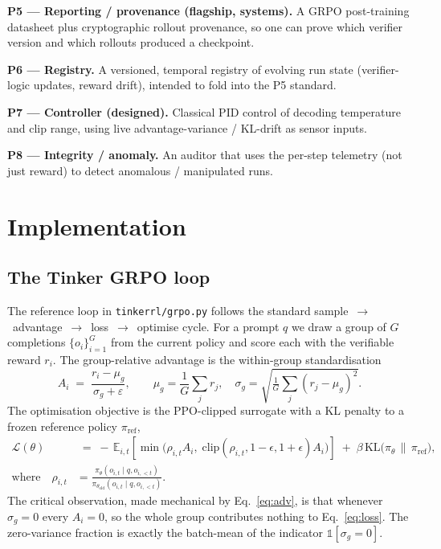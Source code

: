 \documentclass[11pt,a4paper]{article}
\begin{document}
\textbf{P5 --- Reporting / provenance (flagship, systems).} A GRPO post-training
datasheet plus cryptographic rollout provenance, so one can prove which verifier
version and which rollouts produced a checkpoint.


\textbf{P6 --- Registry.} A versioned, temporal registry of evolving run state
(verifier-logic updates, reward drift), intended to fold into the P5 standard.

\textbf{P7 --- Controller (designed).} Classical PID control of decoding temperature
and clip range, using live advantage-variance / KL-drift as sensor inputs.

\textbf{P8 --- Integrity / anomaly.} An auditor that uses the per-step telemetry
(not just reward) to detect anomalous / manipulated runs.

\section{Implementation}
\label{sec:impl}

\subsection{The Tinker GRPO loop}


The reference loop in \texttt{tinkerrl/grpo.py} follows the standard
sample~$\rightarrow$~advantage~$\rightarrow$~loss~$\rightarrow$~optimise cycle.
For a prompt $q$ we draw a group of $G$ completions $\{o_i\}_{i=1}^{G}$ from the
current policy and score each with the verifiable reward $r_i$. The
group-relative advantage is the within-group standardisation
\begin{equation}
A_i \;=\; \frac{r_i - \mu_g}{\sigma_g + \varepsilon},
\qquad
\mu_g = \frac{1}{G}\sum_{j} r_j,\quad
\sigma_g = \sqrt{\tfrac{1}{G}\sum_j (r_j-\mu_g)^2}.
\label{eq:adv}
\end{equation}
The optimisation objective is the PPO-clipped surrogate with a KL penalty to a
frozen reference policy $\pi_{\mathrm{ref}}$,
\begin{align}
\mathcal{L}(\theta) &\;=\;
-\,\mathbb{E}_{i,t}\!\left[
\min\!\big(\rho_{i,t}A_i,\;
\mathrm{clip}(\rho_{i,t},1-\epsilon,1+\epsilon)A_i\big)
\right]
\;+\; \beta\, \mathrm{KL}\!\big(\pi_\theta \,\|\, \pi_{\mathrm{ref}}\big),
\label{eq:loss}\\[0.2em]
\text{where}\quad
\rho_{i,t} &=\frac{\pi_\theta(o_{i,t}\mid q,o_{i,<t})}{\pi_{\theta_{\mathrm{old}}}(o_{i,t}\mid q,o_{i,<t})}.
\nonumber
\end{align}
The critical observation, made mechanical by Eq.~\eqref{eq:adv}, is that whenever
$\sigma_g = 0$ every $A_i = 0$, so the whole group contributes nothing to
Eq.~\eqref{eq:loss}. The zero-variance fraction is exactly the batch-mean of the
indicator $\mathbb{1}[\sigma_g = 0]$.
\end{document}
